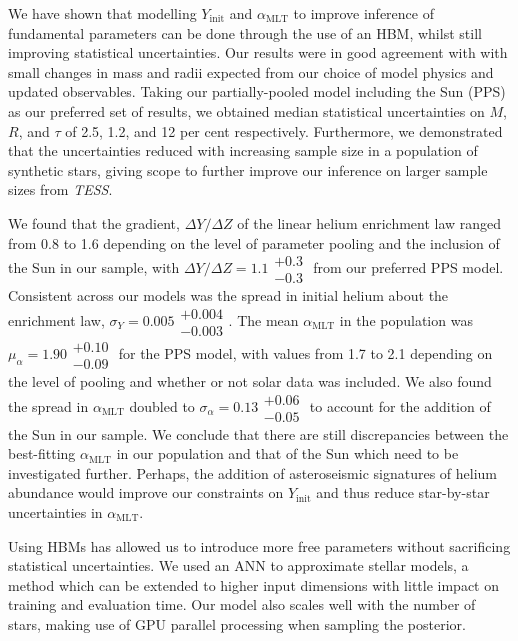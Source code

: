 \documentclass[fleqn,usenatbib]{mnras}
\newcommand{\mlt}{\ensuremath{{\alpha_\mathrm{MLT}}}}
\begin{document}


We have shown that modelling $Y_\mathrm{init}$ and $\mlt$ to improve inference of fundamental parameters can be done through the use of an HBM, whilst still improving statistical uncertainties. Our results were in good agreement with  with small changes in mass and radii expected from our choice of model physics and updated observables. Taking our partially-pooled model including the Sun (PPS) as our preferred set of results, we obtained median statistical uncertainties on $M$, $R$, and $\tau$ of 2.5, 1.2, and 12 per cent respectively. Furthermore, we demonstrated that the uncertainties reduced with increasing sample size in a population of synthetic stars, giving scope to further improve our inference on larger sample sizes from \emph{TESS}.

We found that the gradient, $\Delta Y / \Delta Z$ of the linear helium enrichment law ranged from 0.8 to 1.6 depending on the level of parameter pooling and the inclusion of the Sun in our sample, with $\Delta Y / \Delta Z = 1.1\substack{+0.3\\-0.3}$ from our preferred PPS model. Consistent across our models was the spread in initial helium about the enrichment law, $\sigma_Y = 0.005\substack{+0.004\\-0.003}$. The mean $\mlt$ in the population was $\mu_\alpha = 1.90\substack{+0.10\\-0.09}$ for the PPS model, with values from 1.7 to 2.1 depending on the level of pooling and whether or not solar data was included. We also found the spread in $\mlt$ doubled to $\sigma_\alpha = 0.13\substack{+0.06\\-0.05}$ to account for the addition of the Sun in our sample. We conclude that there are still discrepancies between the best-fitting $\mlt$ in our population and that of the Sun which need to be investigated further. Perhaps, the addition of asteroseismic signatures of helium abundance \citep[see e.g.][]{Verma.Raodeo.ea2017} would improve our constraints on $Y_\mathrm{init}$ and thus reduce star-by-star uncertainties in $\mlt$.

Using HBMs has allowed us to introduce more free parameters without sacrificing statistical uncertainties. We used an ANN to approximate stellar models, a method which can be extended to higher input dimensions with little impact on training and evaluation time. Our model also scales well with the number of stars, making use of GPU parallel processing when sampling the posterior.
\end{document}
